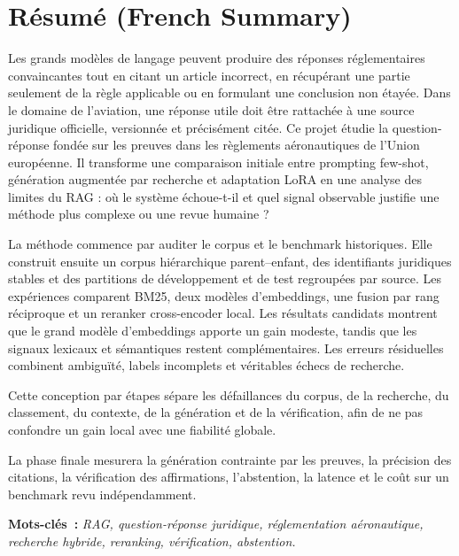 \chapter*{R\'{e}sum\'{e} (French Summary)}

Les grands mod\`{e}les de langage peuvent produire des r\'{e}ponses r\'{e}glementaires convaincantes tout en citant un article incorrect, en r\'{e}cup\'{e}rant une partie seulement de la r\`{e}gle applicable ou en formulant une conclusion non \'etay\'{e}e. Dans le domaine de l'aviation, une r\'{e}ponse utile doit \^{e}tre rattach\'{e}e \`{a} une source juridique officielle, versionn\'{e}e et pr\'{e}cis\'{e}ment cit\'{e}e. Ce projet \'etudie la question-r\'{e}ponse fond\'{e}e sur les preuves dans les r\`{e}glements a\'{e}ronautiques de l'Union europ\'{e}enne. Il transforme une comparaison initiale entre prompting few-shot, g\'{e}n\'{e}ration augment\'{e}e par recherche et adaptation LoRA en une analyse des limites du RAG : o\`{u} le syst\`{e}me \'echoue-t-il et quel signal observable justifie une m\'{e}thode plus complexe ou une revue humaine ?

La m\'{e}thode commence par auditer le corpus et le benchmark historiques. Elle construit ensuite un corpus hi\'{e}rarchique parent--enfant, des identifiants juridiques stables et des partitions de d\'{e}veloppement et de test regroup\'{e}es par source. Les exp\'{e}riences comparent BM25, deux mod\`{e}les d'embeddings, une fusion par rang r\'{e}ciproque et un reranker cross-encoder local. Les r\'{e}sultats candidats montrent que le grand mod\`{e}le d'embeddings apporte un gain modeste, tandis que les signaux lexicaux et s\'{e}mantiques restent compl\'{e}mentaires. Les erreurs r\'{e}siduelles combinent ambigu\"{i}t\'{e}, labels incomplets et v\'{e}ritables \'echecs de recherche.

Cette conception par \'{e}tapes s\'{e}pare les d\'{e}faillances du corpus, de la recherche, du classement, du contexte, de la g\'{e}n\'{e}ration et de la v\'{e}rification, afin de ne pas confondre un gain local avec une fiabilit\'{e} globale.

La phase finale mesurera la g\'{e}n\'{e}ration contrainte par les preuves, la pr\'{e}cision des citations, la v\'{e}rification des affirmations, l'abstention, la latence et le co\^{u}t sur un benchmark revu ind\'{e}pendamment.

\medskip
\noindent\textbf{\color{aivancityNavy}Mots-cl\'{e}s~:}
\textit{\color{aivancityGray}RAG, question-r\'{e}ponse juridique, r\'{e}glementation a\'{e}ronautique, recherche hybride, reranking, v\'{e}rification, abstention.}


